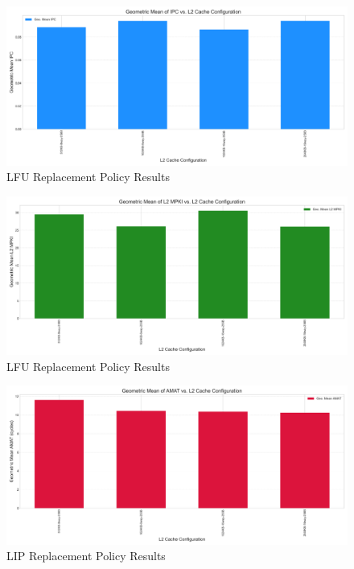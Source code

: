 \documentclass{article}
\begin{document}
\begin{figure}[H]
    \centering
    \includegraphics[width=\textwidth]{figures/lfu/ipc_lfu.png}
    \caption{LFU Replacement Policy Results}
    \label{fig:lfu_ipc}
\end{figure}

\begin{figure}[H]
    \centering
    \includegraphics[width=\textwidth]{figures/lfu/mpki_lfu.png}
    \caption{LFU Replacement Policy Results}
    \label{fig:lfu_mpki}
\end{figure}

\begin{figure}[H]
    \centering
    \includegraphics[width=\textwidth]{figures/lip/amat_lip.png}
    \caption{LIP Replacement Policy Results}
    \label{fig:lip_amat}
\end{figure}
\end{document}
